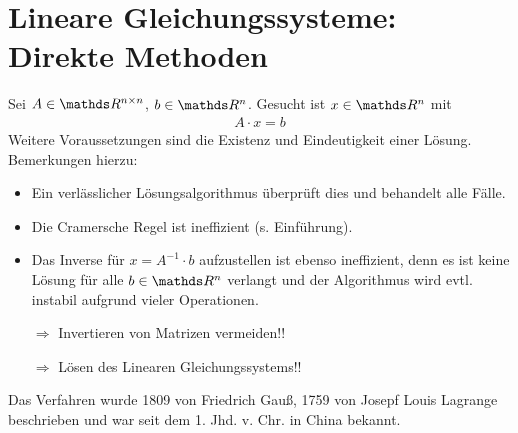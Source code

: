 %
%
%
%


\chapter{Lineare Gleichungssysteme: Direkte Methoden}
Sei $ A \in \R^{n\times n}$, $b \in \R^n$. Gesucht ist $x\in \R^n$ mit 
\begin{gather*}
  A\cdot x = b
\end{gather*}
Weitere Voraussetzungen sind die Existenz und Eindeutigkeit einer Lösung.\\
Bemerkungen hierzu:
\begin{itemize}
\item Ein verlässlicher Lösungsalgorithmus überprüft dies und behandelt alle Fälle. 
\item Die Cramersche Regel ist ineffizient (s. Einführung).
\item Das Inverse für $x=A^{-1}\cdot b$ aufzustellen ist ebenso ineffizient,
  denn es ist keine Lösung für alle $b\in \R^n$ verlangt
  und der Algorithmus wird evtl. instabil aufgrund vieler Operationen.
\item [$\Rightarrow$] Invertieren von Matrizen vermeiden!!
\item [$\Rightarrow$] Lösen des Linearen Gleichungssystems!!
\end{itemize}

 \label{2.2.1}
Das Verfahren wurde 1809 von Friedrich Gauß,
1759 von Josepf Louis Lagrange beschrieben
und war seit dem 1. Jhd. v. Chr. in China bekannt.

